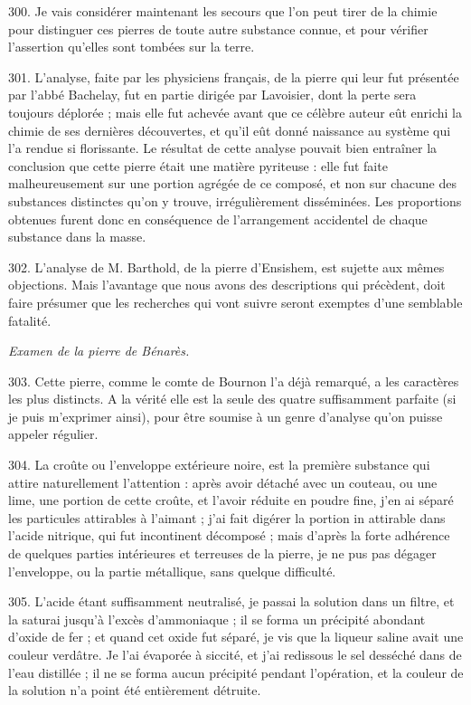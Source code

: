 \documentclass[a4paper, 11pt, oneside, polutonikogreek, french]{article}
\begin{document}
300. Je vais considérer maintenant les secours que l'on peut tirer de la chimie pour distinguer ces pierres de toute autre substance connue, et pour vérifier l'assertion qu'elles sont tombées sur la terre.

301. L'analyse, faite par les physiciens français, de la pierre qui leur fut présentée par l'abbé Bachelay, fut en partie dirigée par Lavoisier, dont la perte sera toujours déplorée ; mais elle fut achevée avant que ce célèbre auteur eût enrichi la chimie de ses dernières découvertes, et qu'il eût donné naissance au système qui l'a rendue si florissante. Le résultat de cette analyse pouvait bien entraîner la conclusion que cette pierre était une matière pyriteuse : elle fut faite malheureusement sur une portion agrégée de ce composé, et non sur chacune des substances distinctes qu'on y trouve, irrégulièrement disséminées. Les proportions obtenues furent donc en conséquence de l'arrangement accidentel de chaque substance dans la masse.

302. L'analyse de M. Barthold, de la pierre d'Ensishem, est sujette aux mêmes objections. Mais l'avantage que nous avons des descriptions qui précèdent, doit faire présumer que les recherches qui vont suivre seront exemptes d'une semblable fatalité.

\emph{Examen de la pierre de Bénarès.}

303. Cette pierre, comme le comte de Bournon l'a déjà remarqué, a les caractères les plus distincts. A la vérité elle est la seule des quatre suffisamment parfaite (si je puis m'exprimer ainsi), pour être soumise à un genre d'analyse qu'on puisse appeler régulier.

304. La croûte ou l'enveloppe extérieure noire, est la première substance qui attire naturellement l'attention : après avoir détaché avec un couteau, ou une lime, une portion de cette croûte, et l'avoir réduite en poudre fine, j'en ai séparé les particules attirables à l'aimant ; j'ai fait digérer la portion in attirable dans l'acide nitrique, qui fut incontinent décomposé ; mais d'après la forte adhérence de quelques parties intérieures et terreuses de la pierre, je ne pus pas dégager l'enveloppe, ou la partie métallique, sans quelque difficulté.

305. L'acide étant suffisamment neutralisé, je passai la solution dans un filtre, et la saturai jusqu'à l'excès d'ammoniaque ; il se forma un précipité abondant d'oxide de fer ; et quand cet oxide fut séparé, je vis que la liqueur saline avait une couleur verdâtre. Je l'ai évaporée à siccité, et j'ai redissous le sel desséché dans de l'eau distillée ; il ne se forma aucun précipité pendant l'opération, et la couleur de la solution n'a point été entièrement détruite.
\end{document}
